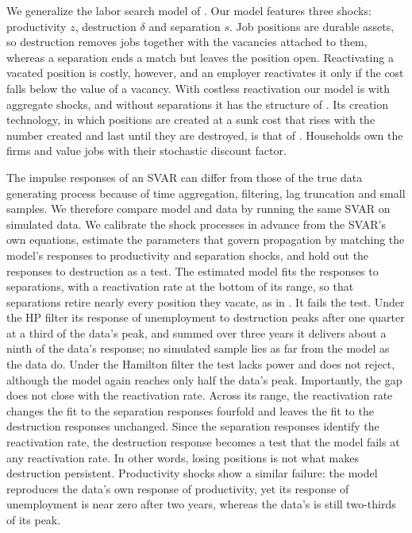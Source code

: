 \documentclass[authoryear, review, 12pt]{elsarticle}
\begin{document}
We generalize the labor search model of \citet{gabrovski_2025}. Our model features three shocks: productivity $z$, destruction $\delta$ and separation $s$. Job positions are durable assets, so destruction removes jobs together with the vacancies attached to them, whereas a separation ends a match but leaves the position open. Reactivating a vacated position is costly, however, and an employer reactivates it only if the cost falls below the value of a vacancy. With costless reactivation our model is \citet{gabrovski_2025} with aggregate shocks, and without separations it has the structure of \citet{coles_2018}. Its creation technology, in which positions are created at a sunk cost that rises with the number created and last until they are destroyed, is that of \citet{fujita_2007}.
Households own the firms and value jobs with their stochastic discount factor.

The impulse responses of an SVAR can differ from those of the true data generating process because of time aggregation, filtering, lag truncation and small samples. We therefore compare model and data by running the same SVAR on simulated data. We calibrate the shock processes in advance from the SVAR's own equations, estimate the parameters that govern propagation by matching the model's responses to productivity and separation shocks, and hold out the responses to destruction as a test. The estimated model fits the responses to separations, with a reactivation rate at the bottom of its range, so that separations retire nearly every position they vacate, as in \citet{coles_2018}. It fails the test. Under the HP filter its response of unemployment to destruction peaks after one quarter at a third of the data's peak, and summed over three years it delivers about a ninth of the data's response; no simulated sample lies as far from the model as the data do. Under the Hamilton filter the test lacks power and does not reject, although the model again reaches only half the data's peak.
Importantly, the gap does not close with the reactivation rate. Across its range, the reactivation rate changes the fit to the separation responses fourfold and leaves the fit to the destruction responses unchanged. Since the separation responses identify the reactivation rate, the destruction response becomes a test that the model fails at any reactivation rate. In other words, losing positions is not what makes destruction persistent. Productivity shocks show a similar failure: the model reproduces the data's own response of productivity, yet its response of unemployment is near zero after two years, whereas the data's is still two-thirds of its peak.
\end{document}
